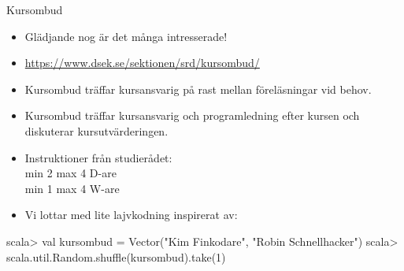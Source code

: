 
\begin{Slide}{Kursombud}
\begin{itemize}
\item Glädjande nog är det många intresserade!
\item \url{https://www.dsek.se/sektionen/srd/kursombud/}
\item Kursombud träffar kursansvarig på rast mellan föreläsningar vid behov.
\item Kursombud träffar kursansvarig och programledning efter kursen och diskuterar kursutvärderingen.
\item Instruktioner från studierådet: \\ min 2 max 4 D-are \\ min 1 max 4 W-are
\item Vi lottar med lite lajvkodning inspirerat av:
\end{itemize}
\begin{REPL}
scala> val kursombud = Vector("Kim Finkodare", "Robin Schnellhacker")
scala> scala.util.Random.shuffle(kursombud).take(1)
\end{REPL}
\end{Slide}
